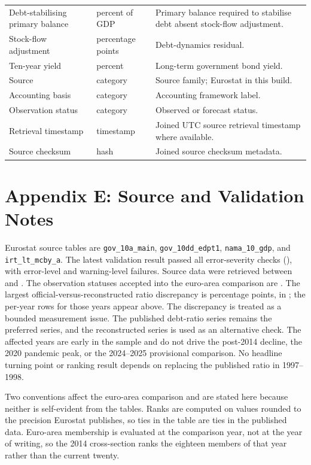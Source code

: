 \documentclass[11pt,a4paper]{article}
\begin{document}
\begin{longtable}{L{0.28\textwidth}L{0.18\textwidth}L{0.46\textwidth}}
Debt-stabilising primary balance & percent of GDP & Primary balance required to stabilise debt absent stock-flow adjustment. \\
Stock-flow adjustment & percentage points & Debt-dynamics residual. \\
Ten-year yield & percent & Long-term government bond yield. \\
Source & category & Source family; Eurostat in this build. \\
Accounting basis & category & Accounting framework label. \\
Observation status & category & Observed or forecast status. \\
Retrieval timestamp & timestamp & Joined UTC source retrieval timestamp where available. \\
Source checksum & hash & Joined source checksum metadata. \\
\bottomrule
\end{longtable}
\endgroup
\normalsize

\section{Appendix E: Source and Validation Notes}

Eurostat source tables are \texttt{gov\_10a\_main},
\texttt{gov\_10dd\_edpt1}, \texttt{nama\_10\_gdp}, and
\texttt{irt\_lt\_mcby\_a}.
The latest validation result passed all error-severity checks
(\ValidationAllErrorsPassed{}), with \ValidationErrorCount{} error-level and
\ValidationWarningCount{} warning-level failures. Source data were retrieved
between \EarliestRetrievalTimestamp{} and \LatestRetrievalTimestamp{}. The
observation statuses accepted into the euro-area comparison are
\AcceptedObservationStatuses{}. The largest official-versus-reconstructed ratio
discrepancy is \MaxRatioDiscrepancyPp{} percentage points, in
\RatioBreachYears{}; the per-year rows for those years appear above.
The discrepancy is treated as a bounded measurement issue. The published
debt-ratio series remains the preferred series, and the reconstructed series
is used as an alternative check. The affected years are early in the sample and
do not drive the post-2014 decline, the 2020 pandemic peak, or the 2024--2025
provisional comparison. No headline turning point or ranking result depends on
replacing the published ratio in 1997--1998.

Two conventions affect the euro-area comparison and are stated here because
neither is self-evident from the tables. Ranks are computed on values rounded
to the precision Eurostat publishes, so ties in the table are ties in the
published data. Euro-area membership is evaluated at the comparison year, not
at the year of writing, so the 2014 cross-section ranks the eighteen members of
that year rather than the current twenty.
\end{document}

